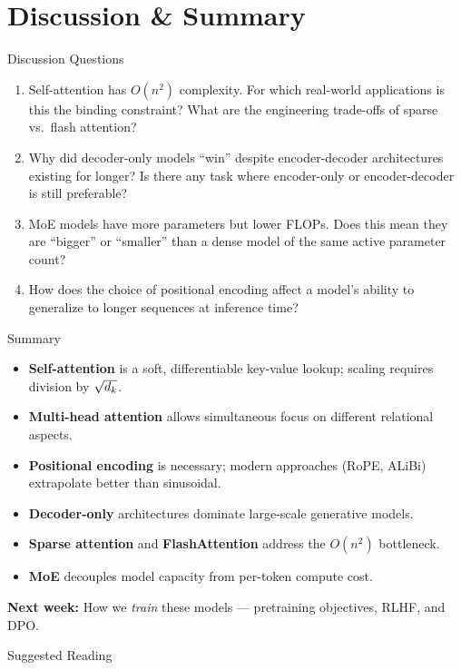 \documentclass[aspectratio=169,10pt]{beamer}
\begin{document}
\section{Discussion \& Summary}
\begin{frame}{Discussion Questions}
  \begin{enumerate}
    \item Self-attention has $O(n^2)$ complexity. For which real-world applications is this the binding constraint? What are the engineering trade-offs of sparse vs.\ flash attention?
    \item Why did decoder-only models ``win'' despite encoder-decoder architectures existing for longer? Is there any task where encoder-only or encoder-decoder is still preferable?
    \item MoE models have more parameters but lower FLOPs. Does this mean they are ``bigger'' or ``smaller'' than a dense model of the same active parameter count?
    \item How does the choice of positional encoding affect a model's ability to generalize to longer sequences at inference time?
  \end{enumerate}
\end{frame}

\begin{frame}{Summary}
  \begin{itemize}
    \item \textbf{Self-attention} is a soft, differentiable key-value lookup; scaling requires division by $\sqrt{d_k}$.
    \item \textbf{Multi-head attention} allows simultaneous focus on different relational aspects.
    \item \textbf{Positional encoding} is necessary; modern approaches (RoPE, ALiBi) extrapolate better than sinusoidal.
    \item \textbf{Decoder-only} architectures dominate large-scale generative models.
    \item \textbf{Sparse attention} and \textbf{FlashAttention} address the $O(n^2)$ bottleneck.
    \item \textbf{MoE} decouples model capacity from per-token compute cost.
  \end{itemize}
  \vspace{0.3em}
  \textbf{Next week:} How we \emph{train} these models — pretraining objectives, RLHF, and DPO.
\end{frame}

\begin{frame}[allowframebreaks]{Suggested Reading}
  \nocite{vaswani2017attention, su2024roformer, press2022alibi,
          child2019sparsetransformer, shazeer2017moe, jiang2024mixtral}
  
\end{frame}
\end{document}

